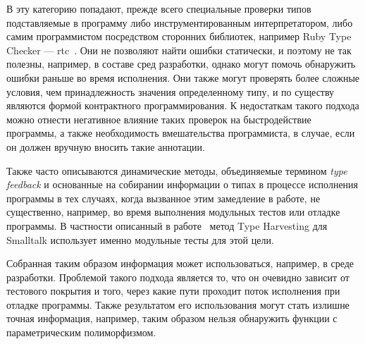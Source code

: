 В эту категорию попадают, прежде всего специальные проверки типов подставляемые в
программу либо инструментированным интерпретатором, либо самим программистом
посредством сторонних библиотек, например Ruby Type Checker ---
rtc~\cite{Ren2013}.  Они не позволяют найти
ошибки статически, и поэтому не так полезны, например, в составе сред
разработки, однако могут помочь обнаружить ошибки раньше во время исполнения.
Они также могут проверять более сложные условия, чем принадлежность значения
определенному типу, и по существу являются формой контрактного программирования.
К недостаткам такого подхода можно отнести негативное влияние таких проверок на
быстродействие программы, а также необходимость вмешательства программиста, в
случае, если он должен вручную вносить такие аннотации. 

Также часто описываются динамические методы, объединяемые термином \emph{type
  feedback} и основанные на собирании информации о типах в процессе исполнения
программы в тех случаях, когда вызванное этим замедление в работе, не
существенно, например, во время выполнения модульных тестов или отладке
программы. В частности описанный в работе~\cite{Haupt2011} метод Type Harvesting
для Smalltalk использует именно модульные тесты для этой цели.

Собранная таким образом информация может использоваться, например, в среде
разработки.  Проблемой такого подхода является то, что он очевидно зависит от
тестового покрытия и того, через какие пути проходит поток исполнения при
отладке программы. Также результатом его использования могут стать излишне
точная информация, например, таким образом нельзя обнаружить функции с
параметрическим полиморфизмом.
